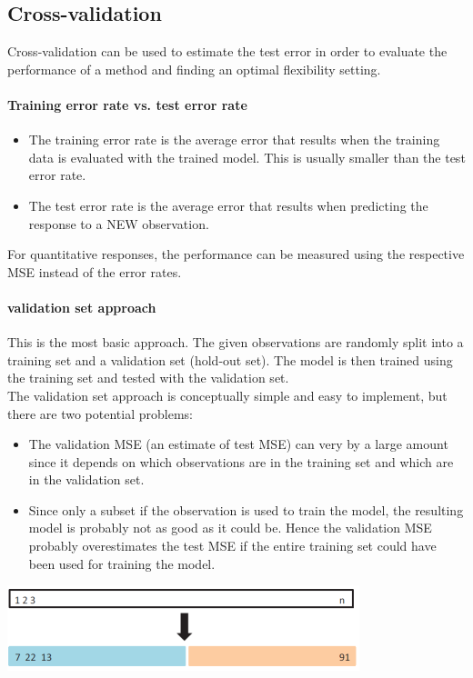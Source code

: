 \documentclass[../document.tex]{subfiles}
\begin{document}
	
	\subsection{Cross-validation}
	Cross-validation can be used to estimate the test error in order to evaluate the performance of a method and finding an optimal flexibility setting.
	\paragraph{Training error rate vs. test error rate}
	\begin{itemize}
		\item The training error rate is the average error that results when the training data is evaluated with the trained model. This is usually smaller than the test error rate.
		\item The test error rate is the average error that results when predicting the response to a NEW observation.
	\end{itemize}
	For quantitative responses, the performance can be measured using the respective MSE instead of the error rates.
	\paragraph{validation set approach}
	This is the most basic approach. The given observations are randomly split into a training set and a validation set (hold-out set). The model is then trained using the training set and tested with the validation set.\\
	The validation set approach is conceptually simple and easy to implement, but there are two potential problems:
	\begin{itemize}
		\item The validation MSE (an estimate of test MSE) can very by a large amount since it depends on which observations are in the training set and which are in the validation set.
		\item Since only a subset if the observation is used to train the model, the resulting model is probably not as good as it could be. Hence the validation MSE probably overestimates the test MSE if the entire training set could have been used for training the model.
	\end{itemize}
	\begin{center}
		\includegraphics[width=.6\textwidth]{pictures/cross_validation_validation_set.png}
	\end{center}
\end{document}
